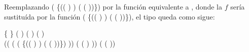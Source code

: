 Reemplazando  (\AgdaSymbol{$\lambda$} \{(( \AgdaInductiveConstructor{,} ) \AgdaInductiveConstructor{,} ) \AgdaSymbol{$\rightarrow$} ( \AgdaInductiveConstructor{,} ( \AgdaInductiveConstructor{,} ))\}) por la función equivalente a , donde la $f$ sería sustituída por la función (\AgdaSymbol{$\lambda$} \{(( \AgdaInductiveConstructor{,} ) \AgdaInductiveConstructor{,} ) \AgdaSymbol{$\rightarrow$} ( \AgdaInductiveConstructor{,} ( \AgdaInductiveConstructor{,} ))\}), el tipo queda como sigue:
\begin{center}
\AgdaSymbol{$\forall$} \{ \AgdaSymbol{:} \} \AgdaSymbol{$\rightarrow$} ( \AgdaSymbol{:} ) ( \AgdaSymbol{:} ) ( \AgdaSymbol{:} ) \AgdaSymbol{$\rightarrow$} \\ ((\AgdaSymbol{$\lambda$}  \AgdaSymbol{$\rightarrow$}  \AgdaField{$\gg=$} (\AgdaSymbol{$\lambda$}  \AgdaSymbol{$\rightarrow$}  (\AgdaSymbol{$\lambda$} \{(( \AgdaInductiveConstructor{,} ) \AgdaInductiveConstructor{,} ) \AgdaSymbol{$\rightarrow$} ( \AgdaInductiveConstructor{,} ( \AgdaInductiveConstructor{,} ))\}) )) ( ( ) ))  (  ( ))
\end{center}

